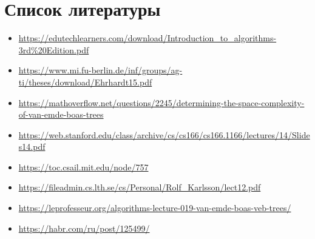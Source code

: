 \documentclass{article}
\begin{document}
\section{Список литературы}
\begin{itemize}
    \item \url{https://edutechlearners.com/download/Introduction_to_algorithms-3rd\%20Edition.pdf}
    \item \url{https://www.mi.fu-berlin.de/inf/groups/ag-ti/theses/download/Ehrhardt15.pdf}
    \item \url{https://mathoverflow.net/questions/2245/determining-the-space-complexity-of-van-emde-boas-trees}
    \item \url{https://web.stanford.edu/class/archive/cs/cs166/cs166.1166/lectures/14/Slides14.pdf}
    \item \url{https://toc.csail.mit.edu/node/757}
    \item \url{https://fileadmin.cs.lth.se/cs/Personal/Rolf_Karlsson/lect12.pdf}
    \item \url{https://leprofesseur.org/algorithms-lecture-019-van-emde-boas-veb-trees/}
    \item \url{https://habr.com/ru/post/125499/}
\end{itemize}
\end{document}
